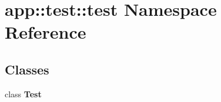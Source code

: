 \section{app::test::test Namespace Reference}
\label{namespaceapp_1_1test_1_1test}


\subsection*{Classes}
\begin{CompactItemize}
\item 
class {\bf Test}
\end{CompactItemize}
